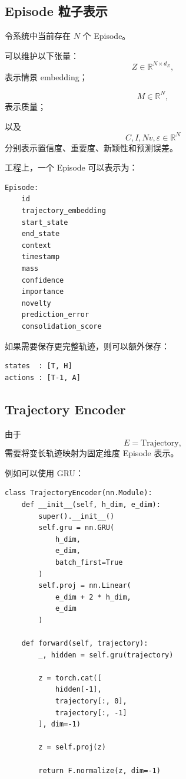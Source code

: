 \subsection{Episode 粒子表示}

令系统中当前存在 $N$ 个 Episode。

可以维护以下张量：
\[
Z
\in
\mathbb R^{N\times d_E},
\]
表示情景 embedding；

\[
M
\in
\mathbb R^N,
\]
表示质量；

以及
\[
C,I,Nv,\varepsilon
\in
\mathbb R^N
\]
分别表示置信度、重要度、新颖性和预测误差。

工程上，一个 Episode 可以表示为：

\begin{verbatim}
Episode:
    id
    trajectory_embedding
    start_state
    end_state
    context
    timestamp
    mass
    confidence
    importance
    novelty
    prediction_error
    consolidation_score
\end{verbatim}

如果需要保存更完整轨迹，则可以额外保存：

\begin{verbatim}
states  : [T, H]
actions : [T-1, A]
\end{verbatim}

\subsection{Trajectory Encoder}

由于
\[
E=\mathrm{Trajectory},
\]
需要将变长轨迹映射为固定维度 Episode 表示。

例如可以使用 GRU：

\begin{verbatim}
class TrajectoryEncoder(nn.Module):
    def __init__(self, h_dim, e_dim):
        super().__init__()
        self.gru = nn.GRU(
            h_dim,
            e_dim,
            batch_first=True
        )
        self.proj = nn.Linear(
            e_dim + 2 * h_dim,
            e_dim
        )

    def forward(self, trajectory):
        _, hidden = self.gru(trajectory)

        z = torch.cat([
            hidden[-1],
            trajectory[:, 0],
            trajectory[:, -1]
        ], dim=-1)

        z = self.proj(z)

        return F.normalize(z, dim=-1)
\end{verbatim}

